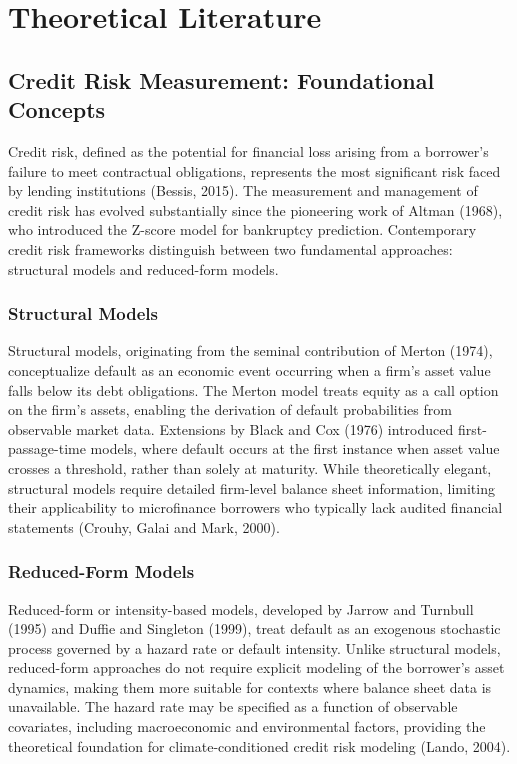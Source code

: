 \documentclass[12pt,a4paper]{article}
\begin{document}
\section{Theoretical Literature}

\subsection{Credit Risk Measurement: Foundational Concepts}

Credit risk, defined as the potential for financial loss arising from a borrower's failure to meet contractual obligations, represents the most significant risk faced by lending institutions (Bessis, 2015). The measurement and management of credit risk has evolved substantially since the pioneering work of Altman (1968), who introduced the Z-score model for bankruptcy prediction. Contemporary credit risk frameworks distinguish between two fundamental approaches: structural models and reduced-form models.

\subsubsection{Structural Models}

Structural models, originating from the seminal contribution of Merton (1974), conceptualize default as an economic event occurring when a firm's asset value falls below its debt obligations. The Merton model treats equity as a call option on the firm's assets, enabling the derivation of default probabilities from observable market data. Extensions by Black and Cox (1976) introduced first-passage-time models, where default occurs at the first instance when asset value crosses a threshold, rather than solely at maturity. While theoretically elegant, structural models require detailed firm-level balance sheet information, limiting their applicability to microfinance borrowers who typically lack audited financial statements (Crouhy, Galai and Mark, 2000).

\subsubsection{Reduced-Form Models}

Reduced-form or intensity-based models, developed by Jarrow and Turnbull (1995) and Duffie and Singleton (1999), treat default as an exogenous stochastic process governed by a hazard rate or default intensity. Unlike structural models, reduced-form approaches do not require explicit modeling of the borrower's asset dynamics, making them more suitable for contexts where balance sheet data is unavailable. The hazard rate may be specified as a function of observable covariates, including macroeconomic and environmental factors, providing the theoretical foundation for climate-conditioned credit risk modeling (Lando, 2004).
\end{document}
